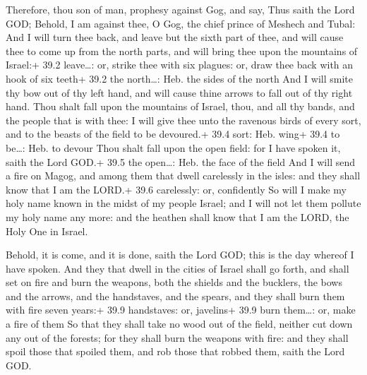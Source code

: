  Therefore, thou son of man, prophesy against Gog, and say,
Thus saith the Lord GOD; Behold, I am against thee, O Gog, the chief
prince of Meshech and Tubal:  And I will turn thee back, and
leave but the sixth part of thee, and will cause thee to come up from
the north parts, and will bring thee upon the mountains of Israel:+ 39.2
leave\ldots: or, strike thee with six plagues: or, draw thee back with
an hook of six teeth+ 39.2 the north\ldots: Heb. the sides of the north
 And I will smite thy bow out of thy left hand, and will
cause thine arrows to fall out of thy right hand.  Thou
shalt fall upon the mountains of Israel, thou, and all thy bands, and
the people that is with thee: I will give thee unto the ravenous birds
of every sort, and to the beasts of the field to be devoured.+ 39.4
sort: Heb. wing+ 39.4 to be\ldots: Heb. to devour  Thou
shalt fall upon the open field: for I have spoken it, saith the Lord
GOD.+ 39.5 the open\ldots: Heb. the face of the field  And I
will send a fire on Magog, and among them that dwell carelessly in the
isles: and they shall know that I am the LORD.+ 39.6 carelessly: or,
confidently  So will I make my holy name known in the midst
of my people Israel; and I will not let them pollute my holy name any
more: and the heathen shall know that I am the LORD, the Holy One in
Israel.

 Behold, it is come, and it is done, saith the Lord GOD;
this is the day whereof I have spoken.  And they that dwell
in the cities of Israel shall go forth, and shall set on fire and burn
the weapons, both the shields and the bucklers, the bows and the arrows,
and the handstaves, and the spears, and they shall burn them with fire
seven years:+ 39.9 handstaves: or, javelins+ 39.9 burn them\ldots: or,
make a fire of them  So that they shall take no wood out of
the field, neither cut down any out of the forests; for they shall burn
the weapons with fire: and they shall spoil those that spoiled them, and
rob those that robbed them, saith the Lord GOD.

